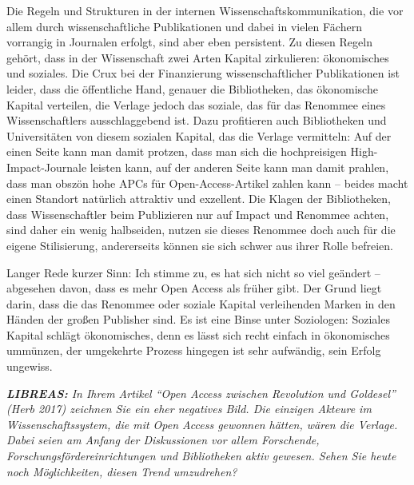 \documentclass[a4paper,
fontsize=11pt,
oneside,
numbers=noperiodatend,
parskip=half-,
bibliography=totoc,
final
]{scrartcl}
\begin{document}
Die Regeln und Strukturen in der internen Wissenschaftskommunikation,
die vor allem durch wissenschaftliche Publikationen und dabei in vielen
Fächern vorrangig in Journalen erfolgt, sind aber eben persistent. Zu
diesen Regeln gehört, dass in der Wissenschaft zwei Arten Kapital
zirkulieren: ökonomisches und soziales. Die Crux bei der Finanzierung
wissenschaftlicher Publikationen ist leider, dass die öffentliche Hand,
genauer die Bibliotheken, das ökonomische Kapital verteilen, die Verlage
jedoch das soziale, das für das Renommee eines Wissenschaftlers
ausschlaggebend ist. Dazu profitieren auch Bibliotheken und
Universitäten von diesem sozialen Kapital, das die Verlage vermitteln:
Auf der einen Seite kann man damit protzen, dass man sich die
hochpreisigen High-Impact-Journale leisten kann, auf der anderen Seite
kann man damit prahlen, dass man obszön hohe APCs für
Open-Access-Artikel zahlen kann -- beides macht einen Standort natürlich
attraktiv und exzellent. Die Klagen der Bibliotheken, dass
Wissenschaftler beim Publizieren nur auf Impact und Renommee achten,
sind daher ein wenig halbseiden, nutzen sie dieses Renommee doch auch
für die eigene Stilisierung, andererseits können sie sich schwer aus
ihrer Rolle befreien.

Langer Rede kurzer Sinn: Ich stimme zu, es hat sich nicht so viel
geändert -- abgesehen davon, dass es mehr Open Access als früher gibt.
Der Grund liegt darin, dass die das Renommee oder soziale Kapital
verleihenden Marken in den Händen der großen Publisher sind. Es ist eine
Binse unter Soziologen: Soziales Kapital schlägt ökonomisches, denn es
lässt sich recht einfach in ökonomisches ummünzen, der umgekehrte
Prozess hingegen ist sehr aufwändig, sein Erfolg ungewiss.

\emph{\textbf{LIBREAS:} In Ihrem Artikel \enquote{Open Access zwischen
Revolution und Goldesel} (Herb 2017) zeichnen Sie ein eher negatives
Bild. Die einzigen Akteure im Wissenschaftssystem, die mit Open Access
gewonnen hätten, wären die Verlage. Dabei seien am Anfang der
Diskussionen vor allem Forschende, Forschungsfördereinrichtungen und
Bibliotheken aktiv gewesen. Sehen Sie heute noch Möglichkeiten, diesen
Trend umzudrehen?}
\end{document}
